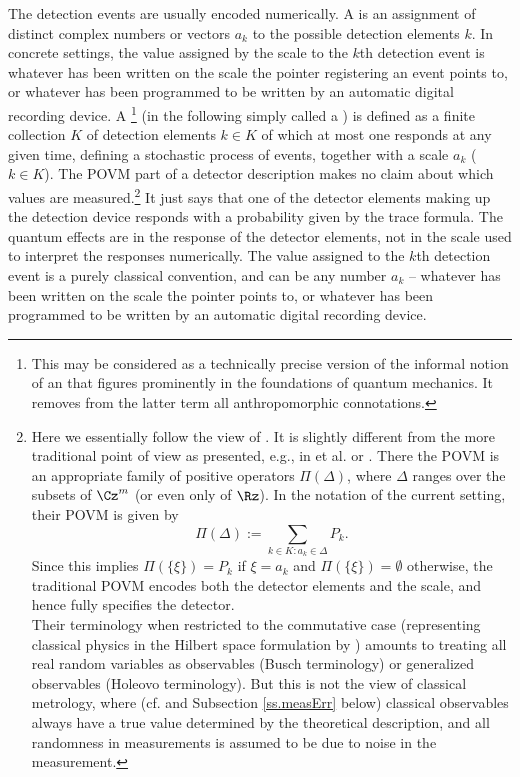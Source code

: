 \documentclass[12pt]{article}
\begin{document}
The detection events are usually encoded numerically.
A  is an assignment of distinct
complex numbers or vectors $a_k$ to the possible detection elements $k$.
In concrete settings, the value assigned by the scale to the $k$th
detection event is whatever has been written on the scale the pointer
registering an event points to, or whatever has been programmed to be
written by an automatic digital recording device.
A \footnote{
This may be considered as a technically precise version of the informal
notion of an  that figures prominently in the foundations
of quantum mechanics. It removes from the latter term all
anthropomorphic connotations.
} %
(in the following simply called a ) is defined as a finite
collection $K$ of detection elements $k\in K$ of which at most one
responds at any given time, defining a stochastic process of events,
together with a scale $a_k$ ($k\in K$). The POVM part of a detector
description makes no claim about which values are
measured.\footnote{\label{f.POVM}
Here we essentially follow the view of 
\cite{Schr1985,Schr1989}. It is slightly different from the
more traditional point of view as presented, e.g., in  et al.
\cite{BusGL,BusLPY} or  \cite{Hol1982,Hol2001,Hol2012}.
There the POVM is an appropriate family of positive operators
$\Pi(\Delta)$, where $\Delta$ ranges over the subsets of $\Cz^m$ (or
even only of $\Rz$). In the notation of the current setting, their POVM
is given by
\[
\Pi(\Delta):=\sum_{k\in K: a_k\in\Delta} P_k.
\]
Since this implies $\Pi(\{\xi\})=P_k$ if $\xi=a_k$ and
$\Pi(\{\xi\})=\emptyset$ otherwise, the traditional POVM encodes both
the detector elements and the scale, and hence fully specifies the
detector.
\\
Their terminology when restricted to the commutative case (representing
classical physics in the Hilbert space formulation by 
\cite{Koo}) amounts to treating all real random variables as observables
(Busch terminology) or generalized observables (Holeovo terminology).
But this is not the view of classical metrology, where 
(cf.  \cite{Rab} and Subsection \ref{ss.measErr} below) 
classical observables always have a true value determined by the 
theoretical description, and all randomness in measurements is assumed 
to be due to noise in the measurement.
} %
It just says that one of the detector
elements making up the detection device responds with a probability
given by the trace formula. The quantum effects are in the response of
the detector elements, not in the scale used to interpret the responses
numerically. The value assigned to the $k$th detection event is a purely
classical convention, and can be any number $a_k$ -- whatever has been
written on the scale the pointer points to, or whatever has been
programmed to be written by an automatic digital recording device.
\end{document}
